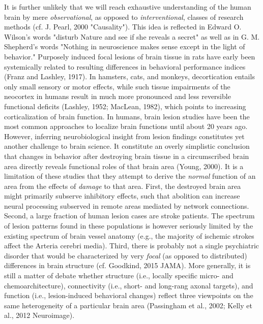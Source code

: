 \documentclass[authoryear,review,3p]{elsarticle}
\begin{document}
It is further unlikely that we
will reach exhaustive understanding of
the human brain by mere
\textit{observational}, as opposed to \textit{interventional},
classes of research methods
(cf. J. Pearl, 2000 "Causality").
This idea is reflected in
Edward O. Wilson's words
"disturb Nature and see if she reveals a secret"
as well as in
G. M. Shepherd's words
"Nothing in neuroscience makes sense except in the light of behavior."
%
Purposely induced focal lesions of brain tissue in rats have early
been systemically related to resulting differences in
behavioral performance indices
(Franz and Lashley, 1917).
In hamsters, cats, and monkeys,
decortication entails only small sensory or motor effects,
while such tissue impairments of the neocortex in humans
result in much more pronounced and less reversible 
functional deficits
(Lashley, 1952; MacLean, 1982),
which points to increasing corticalization of brain function.
In humans, brain lesion studies have been
the most common approaches
to localize brain functions
until about 20 years ago.
%
However, inferring neurobiological insight from lesion findings constitutes
yet another challenge to brain science.
It constitute an overly simplistic conclusion that
changes in behavior after destroying brain tissue in a
circumscribed brain area directly reveals functional roles
of that brain area (Young, 2000).
It is a limitation of these studies that
they attempt to derive the \textit{normal} function of
an area from the effects of \textit{damage} to that area.
%
First,
the destroyed brain area might  primarily subserve inhibitory effects,
such that abolition can increase neural processing subserved in remote areas
mediated by network connections.
Second,
a large fraction of human lesion cases are stroke patients.
The spectrum of lesion patterns found in these populations
is however seriously limited by the existing spectrum of
brain vessel anatomy
(e.g., the majority of ischemic strokes affect the Arteria cerebri media).
Third,
there is probably not a single psychiatric disorder that would be
characterized by very \textit{focal} (as opposed to distributed)
differences in brain structure
(cf. Goodkind, 2015 JAMA).
%
More generally, it is still a matter of debate whether
structure (i.e., locally specific micro- and chemoarchitecture),
connectivity (i.e., short- and long-rang axonal targets),
and function (i.e., lesion-induced behavioral changes)
reflect three  viewpoints on the same heterogeneity of
a particular brain area
(Passingham et al., 2002; Kelly et al., 2012 Neuroimage).
\end{document}

